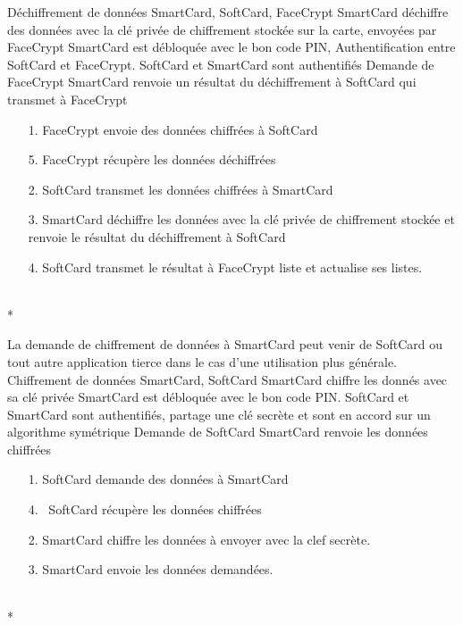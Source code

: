 \documentclass[a4paper,11pt,french]{article}
\begin{document}
\fiche
{Déchiffrement de données}
	{SmartCard, SoftCard, FaceCrypt}
    {SmartCard déchiffre des données avec la clé privée de chiffrement stockée 
    sur la carte, envoyées par FaceCrypt}
    {SmartCard est débloquée avec le bon code PIN, Authentification entre 
    SoftCard et FaceCrypt.  SoftCard et SmartCard sont authentifiés}
    {Demande de FaceCrypt}
    {SmartCard renvoie un résultat du déchiffrement à SoftCard qui transmet à 
    FaceCrypt}
    {\begin{itemize}
        \item[]        
        \item[1.] FaceCrypt envoie des données chiffrées à SoftCard
        \item[5.] FaceCrypt récupère les données déchiffrées
    \end{itemize}}
	{\begin{itemize}
        \item[]		
        \item[2.] SoftCard transmet les données chiffrées à SmartCard
	\item[3.] SmartCard déchiffre les données avec la clé privée de 
        chiffrement stockée et renvoie le résultat du déchiffrement à SoftCard
	\item[4.] SoftCard transmet le résultat à FaceCrypt
		liste et actualise ses listes.
	\end{itemize}
	}
	{}
\flots
    {}
    {}
\\*

La demande de chiffrement de données à SmartCard peut venir de SoftCard ou 
tout autre application tierce dans le cas d'une utilisation plus générale.\\

\fiche
{Chiffrement de données}
	{SmartCard, SoftCard}
    {SmartCard chiffre les donnés avec sa clé privée}
    {SmartCard est débloquée avec le bon code PIN.   SoftCard et SmartCard 
    sont authentifiés, partage une clé secrète et sont en accord sur un 
    algorithme symétrique}
    {Demande de SoftCard}
    {SmartCard renvoie les données chiffrées}
    {\begin{itemize}
        \item[]
        \item[1.] SoftCard demande des données à SmartCard
        \item[4.] SoftCard récupère les données chiffrées 
    \end{itemize}}
	{\begin{itemize}
        \item[]
        \item[2.] SmartCard chiffre les données à envoyer avec la clef secrète.
		\item[3.] SmartCard envoie les données demandées.
	\end{itemize}
	}
	{}
\flots
    {}
    {}
\\*
\end{document}
